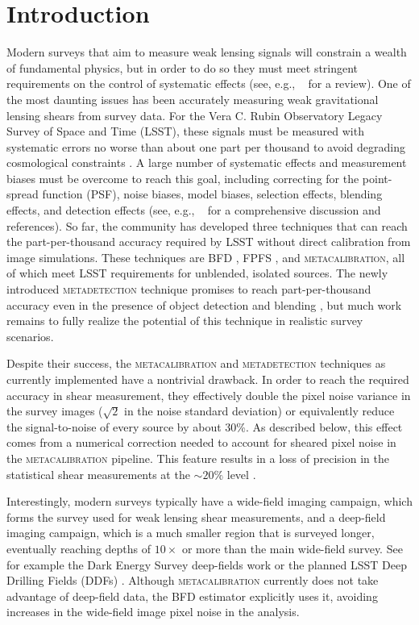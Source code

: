 \documentclass[twocolumn]{openjournal}
\makeatletter
\newcommand{\mdet}{\textsc{metadetection}\@\xspace}
\newcommand{\mcal}{\textsc{metacalibration}\@\xspace}
\makeatother
\begin{document}
\section{Introduction}\label{sec:intro}

Modern surveys that aim to measure weak lensing signals will constrain a wealth of
fundamental physics, but in order to do so they must meet stringent requirements on the control of systematic
effects (see, e.g., \citeauthor{MandelbaumReview}~\citeyear{MandelbaumReview} for a
review). One of the most daunting issues has been accurately measuring weak
gravitational lensing shears from survey data. For the Vera C. Rubin Observatory Legacy
Survey of Space and Time (LSST), these signals must be measured with systematic
errors no worse than about one part per thousand to avoid degrading cosmological
constraints \citep{huterer2006,descsrd}. A large number of systematic effects and
measurement biases must be overcome to reach this goal, including correcting for the
point-spread function (PSF), noise biases, model biases, selection effects, blending
effects, and detection effects (see, e.g.,
\citeauthor{MandelbaumReview}~\citeyear{MandelbaumReview} for a comprehensive discussion
and references). So far, the community has developed three techniques
that can reach the part-per-thousand accuracy required by LSST without direct
calibration from image simulations. These techniques are BFD \citep{BernBFD2016,ba14},
FPFS \citep{li2018fpfs,li2022fpfs}, and \mcal \citep{SheldonMcal2017,HuffMcal2017},
all of which meet LSST requirements for unblended, isolated sources. The newly
introduced \mdet technique promises to reach part-per-thousand accuracy even in the
presence of object detection and blending \citep{SheldonMdet2022}, but much work
remains to fully realize the potential of this technique in realistic survey scenarios.

Despite their success, the \mcal and \mdet techniques as currently implemented
have a nontrivial drawback. In order to reach the required accuracy in shear
measurement, they effectively double the pixel noise variance in the survey images
($\sqrt{2}$ in the noise standard deviation)
or equivalently reduce the signal-to-noise of every source by
about 30\%. As described below, this
effect comes from a numerical correction needed to account for sheared pixel
noise in the \mcal pipeline. This feature results in a loss of precision in the
statistical shear measurements at the $\sim 20\%$ level \citep{SheldonMcal2017}.

Interestingly, modern surveys typically have a wide-field imaging campaign, which forms
the survey used for weak lensing shear measurements, and a deep-field imaging campaign,
which is a much smaller region that is surveyed longer, eventually reaching depths of
$10\times$ or more than the main wide-field survey. See for example the Dark Energy
Survey deep-fields work \citep{DESDeepFields} or the planned LSST Deep Drilling Fields
(DDFs) \citep{lsst-ddf-design,lsst-ddf-depth,ivezic2019lsst}. Although \mcal currently
does not take advantage of deep-field data, the BFD estimator explicitly uses it,
avoiding increases in the wide-field image pixel noise in the analysis.
\end{document}
